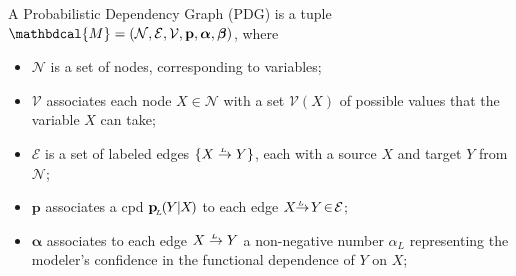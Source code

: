 \documentclass[twoside]{article}
\theoremstyle{plain}
\theoremstyle{definition}
\newcommand{\mat}[1]{\mathbf{#1}}
\newcommand{\ssub}[1]{_{\!_{#1}\!}}
\newcommand{\bp}[1][L]{\mat{p}\ssub{#1}}
\newcommand{\V}{\mathcal V}
\newcommand{\N}{\mathcal N}
\newcommand{\Ed}{\mathcal E}
\newcommand{\dg}[1]{\mathbdcal{#1}}
\newcommand{\ed}[3]{#2%
	  \overset{\smash{\mskip-5mu\raisebox{-1pt}{$\scriptscriptstyle
	        #1$}}}{\rightarrow} #3}
\begin{document}
\begin{defn}
    \label{defn:pdg}
	A Probabilistic Dependency Graph (PDG)
	is a tuple $\dg M = (\N,\Ed,\V,\mat p, \boldsymbol\alpha, \boldsymbol\beta)$, where
    \vspace{-1em}
    \begin{itemize}[leftmargin=1.5em, itemsep=0pt]
        \item $\N$
			is a set of nodes, corresponding to variables;
		\item $\V$
			associates each node $X \in \N$ with a set $\V(X)$ of possible values that the variable $X$ can take;
   		\item $\Ed$
			is a set of labeled  edges $\{ \ed LXY \}$, each with a source
			$X$ and target $Y$ from $\N$;
        \item $\mat p$
		associates
        a cpd $\bp(\mskip-1muY\mskip-1mu|\mskip-1muX\mskip-2mu)$
        to each edge $\ed L{X\!\!}{\!Y} \!\in\! \Ed$;
		\item $\boldsymbol\alpha$
		associates to each edge $\ed L{X}{Y}$ a non-negative number $\alpha_L$
	    representing
	    the modeler's confidence in the functional dependence of $Y$ on $X$;


\end{itemize}
\end{defn}
\end{document}
